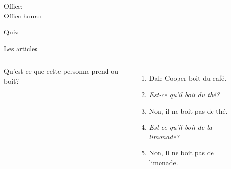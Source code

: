 \documentclass{beamer}
\subtitle[Casse-croûtes et articles]{Les casse-croûtes et les articles}
\begin{document}
  \begin{frame}
    \titlepage
    \tiny{Office: \\
          Office hours: }
  \end{frame}

  \begin{frame}{}
    \begin{center}
      \Large Quiz
    \end{center}
  \end{frame}

  \begin{frame}{Les articles}
    \begin{columns}
        Qu'est-ce que cette personne prend ou boit?
        \begin{enumerate}
          \item<2-> Dale Cooper boit du café.
          \item<2-> \emph{Est-ce qu'il boit du thé?}
          \item<3-> Non, il ne boit pas de thé.
          \item<3-> \emph{Est-ce qu'il boit de la limonade?}
          \item<4-> Non, il ne boit pas de limonade.
        \end{enumerate}
        \begin{minipage}[c][0.6\textwidth]{\linewidth}
          \begin{center}
          \end{center}
        \end{minipage}
    \end{columns}
  \end{frame}
\end{document}
